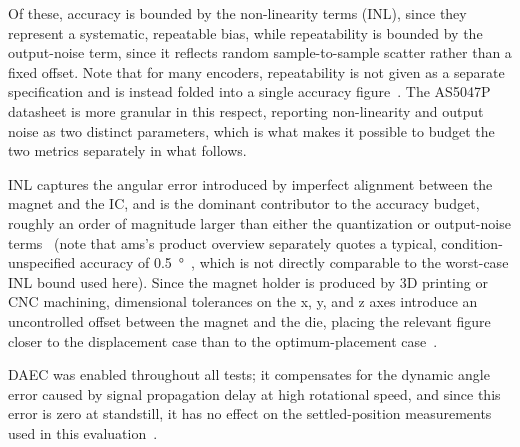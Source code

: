 Of these, accuracy is bounded by the non-linearity terms (INL), since they represent a systematic, repeatable bias, while repeatability is bounded by the output-noise term, since it reflects random sample-to-sample scatter rather than a fixed offset. Note that for many encoders, repeatability is not given as a separate specification and is instead folded into a single accuracy figure~\cite{rls_encoder_handbook}. The AS5047P datasheet is more granular in this respect, reporting non-linearity and output noise as two distinct parameters, which is what makes it possible to budget the two metrics separately in what follows.

INL captures the angular error introduced by imperfect alignment between the magnet and the IC, and is the dominant contributor to the accuracy budget, roughly an order of magnitude larger than either the quantization or output-noise terms~\cite{as5047p_datasheet} (note that ams's product overview separately quotes a typical, condition-unspecified accuracy of \SI{0.5}{\degree}~\cite{as5047p_product_page}, which is not directly comparable to the worst-case INL bound used here). Since the magnet holder is produced by 3D printing or CNC machining, dimensional tolerances on the x, y, and z axes introduce an uncontrolled offset between the magnet and the die, placing the relevant figure closer to the displacement case than to the optimum-placement case~\cite{as5047p_datasheet}.

DAEC was enabled throughout all tests; it compensates for the dynamic angle error caused by signal propagation delay at high rotational speed, and since this error is zero at standstill, it has no effect on the settled-position measurements used in this evaluation~\cite{as5047p_daec_appnote}.